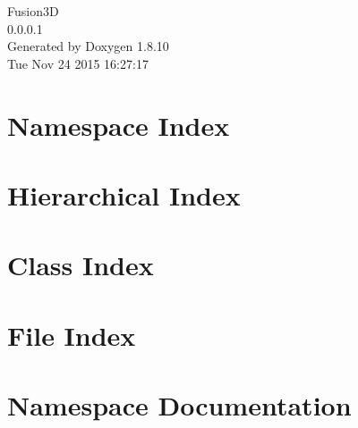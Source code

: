\documentclass[twoside]{book}
\newcommand{\+}{\discretionary{\mbox{\scriptsize$\hookleftarrow$}}{}{}}
\newcommand{\clearemptydoublepage}{%
  \newpage{\pagestyle{empty}\cleardoublepage}%
}
\begin{document}
\hypersetup{pageanchor=false,
             bookmarks=true,
             bookmarksnumbered=true,
             pdfencoding=unicode
            }
\begin{titlepage}
\vspace*{7cm}
\begin{center}%
{\Large Fusion3\+D \\[1ex]\large 0.\+0.\+0.\+1 }\\
\vspace*{1cm}
{\large Generated by Doxygen 1.8.10}\\
\vspace*{0.5cm}
{\small Tue Nov 24 2015 16:27:17}\\
\end{center}
\end{titlepage}
\clearemptydoublepage
\tableofcontents
\clearemptydoublepage
{}
\hypersetup{pageanchor=true}

\chapter{Namespace Index}

\chapter{Hierarchical Index}

\chapter{Class Index}

\chapter{File Index}

\chapter{Namespace Documentation}



\end{document}
